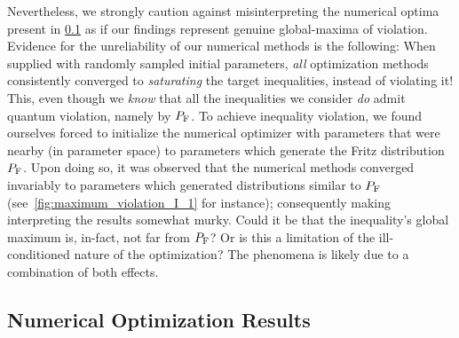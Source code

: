 \documentclass[aps, 10pt, english, twoside, pra, nofootinbib, tightenlines, longbibliography, superscriptaddress]{revtex4-1}
\begin{document}
    Nevertheless, we strongly caution against misinterpreting the numerical optima present in \cref{sec:optima} as if our findings represent genuine global-maxima of violation. Evidence for the unreliability of our numerical methods is the following: When supplied with randomly sampled initial parameters, \emph{all} optimization methods consistently converged to \emph{saturating} the target inequalities, instead of violating it! This, even though we \emph{know} that all the inequalities we consider \emph{do} admit quantum violation, namely by  $\prob[\fritz]$. To achieve inequality violation, we found ourselves forced to initialize the numerical optimizer with parameters that were nearby (in parameter space) to parameters which generate the Fritz distribution $\prob[\fritz]$. Upon doing so, it was observed that the numerical methods converged invariably to parameters which generated distributions similar to $\prob[\fritz]$ (see~\cref{fig:maximum_violation_I_1} for instance); consequently making interpreting the results somewhat murky. Could it be that the inequality's global maximum is, in-fact, not far from $\prob[\fritz]$? Or is this a limitation of the ill-conditioned nature of the optimization? The phenomena is likely due to a combination of both effects.

    \subsection{Numerical Optimization Results}\label{sec:optima}
\end{document}

